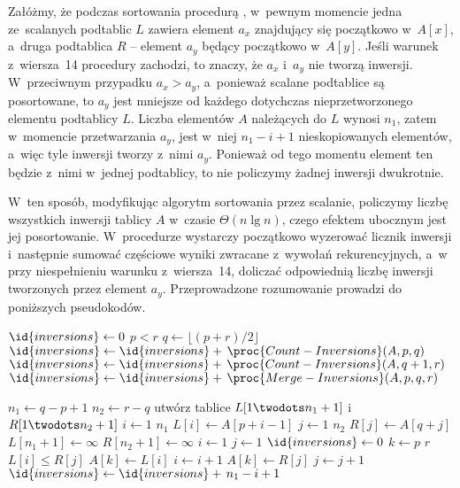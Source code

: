 \subproblem %
Załóżmy, że podczas sortowania procedurą , w~pewnym momencie jedna ze~scalanych podtablic $L$ zawiera element $a_x$ znajdujący się początkowo w~$A[x]$, a~druga podtablica $R$ -- element $a_y$ będący początkowo w~$A[y]$. Jeśli warunek z~wiersza~14 procedury  zachodzi, to znaczy, że $a_x$ i~$a_y$ nie tworzą inwersji. W~przeciwnym przypadku $a_x>a_y$, a~ponieważ scalane podtablice są posortowane, to $a_y$ jest mniejsze od każdego dotychczas nieprzetworzonego elementu podtablicy $L$. Liczba elementów $A$ należących do $L$ wynosi $n_1$, zatem w~momencie przetwarzania $a_y$, jest w~niej $n_1-i+1$ nieskopiowanych elementów, a~więc tyle inwersji tworzy z~nimi $a_y$. Ponieważ od tego momentu element ten będzie z~nimi w~jednej podtablicy, to nie policzymy żadnej inwersji dwukrotnie.

W~ten sposób, modyfikując algorytm sortowania przez scalanie, policzymy liczbę wszystkich inwersji  tablicy $A$ w~czasie $\Theta(n\lg n)$, czego efektem ubocznym jest jej posortowanie. W~procedurze  wystarczy początkowo wyzerować licznik inwersji i~następnie sumować częściowe wyniki zwracane z~wywołań rekurencyjnych, a~w  przy niespełnieniu warunku z~wiersza~14, doliczać odpowiednią liczbę inwersji tworzonych przez element $a_y$. Przeprowadzone rozumowanie prowadzi do poniższych pseudokodów.

\begin{codebox}
\li	$\id{inversions}\gets0$
\li	\If $p<r$
\li		\Then
			$q\gets\lfloor(p+r)/2\rfloor$
\li			$\id{inversions}\gets\id{inversions}+\,\proc{Count-Inversions}(A,p,q)$
\li			$\id{inversions}\gets\id{inversions}+\,\proc{Count-Inversions}(A,q+1,r)$
\li			$\id{inversions}\gets\id{inversions}+\,\proc{Merge-Inversions}(A,p,q,r)$
		\End
\li	\Return {}
\end{codebox}

\begin{codebox}
\li	$n_1\gets q-p+1$
\li	$n_2\gets r-q$
\li	utwórz tablice $L[1\twodots n_1+1]$ i~$R[1\twodots n_2+1]$
\li	\For $i\gets1$ \To $n_1$
\li		\Do $L[i]\gets A[p+i-1]$
		\End
\li	\For $j\gets1$ \To $n_2$
\li		\Do $R[j]\gets A[q+j]$
		\End
\li	$L[n_1+1]\gets\infty$
\li	$R[n_2+1]\gets\infty$
\li	$i\gets1$
\li	$j\gets1$
\li	$\id{inversions}\gets0$
\li	\For $k\gets p$ \To $r$
\li		\Do
\li			\If $L[i]\le R[j]$
\li				\Then
					$A[k]\gets L[i]$
\li					$i\gets i+1$
\li				\Else
					$A[k]\gets R[j]$
\li					$j\gets j+1$
\li					$\id{inversions}\gets\id{inversions}+\,n_1-i+1$
				\End
		\End
\li	\Return {}
\end{codebox}

\endinput
